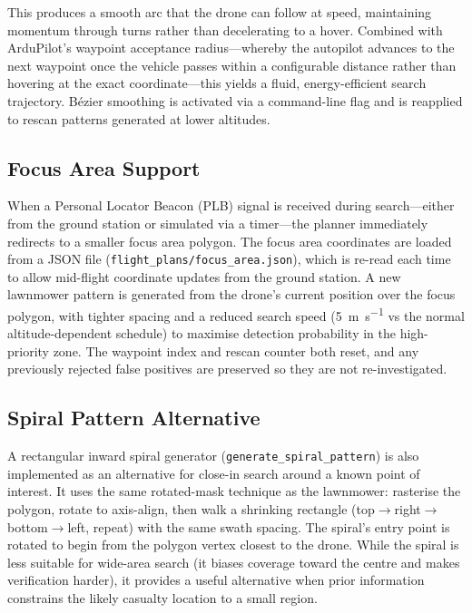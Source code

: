 \noindent This produces a smooth arc that the drone can follow at speed, maintaining momentum through turns rather than decelerating to a hover. Combined with ArduPilot's waypoint acceptance radius---whereby the autopilot advances to the next waypoint once the vehicle passes within a configurable distance rather than hovering at the exact coordinate---this yields a fluid, energy-efficient search trajectory. B\'{e}zier smoothing is activated via a command-line flag and is reapplied to rescan patterns generated at lower altitudes.

\subsection{Focus Area Support}\label{sec:focus-area}

When a Personal Locator Beacon (PLB) signal is received during search---either from the ground station or simulated via a timer---the planner immediately redirects to a smaller focus area polygon. The focus area coordinates are loaded from a JSON file (\texttt{flight\_plans/focus\_area.json}), which is re-read each time to allow mid-flight coordinate updates from the ground station. A new lawnmower pattern is generated from the drone's current position over the focus polygon, with tighter spacing and a reduced search speed (\SI{5}{\metre\per\second} vs the normal altitude-dependent schedule) to maximise detection probability in the high-priority zone. The waypoint index and rescan counter both reset, and any previously rejected false positives are preserved so they are not re-investigated.

\subsection{Spiral Pattern Alternative}\label{sec:spiral}

A rectangular inward spiral generator (\texttt{generate\_spiral\_pattern}) is also implemented as an alternative for close-in search around a known point of interest. It uses the same rotated-mask technique as the lawnmower: rasterise the polygon, rotate to axis-align, then walk a shrinking rectangle (top$\to$right$\to$bottom$\to$left, repeat) with the same swath spacing. The spiral's entry point is rotated to begin from the polygon vertex closest to the drone. While the spiral is less suitable for wide-area search (it biases coverage toward the centre and makes verification harder), it provides a useful alternative when prior information constrains the likely casualty location to a small region.

